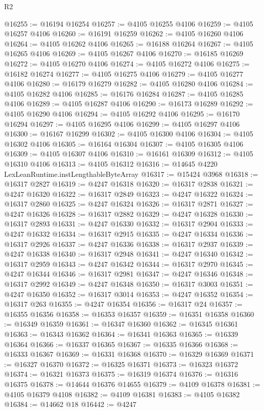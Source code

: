\begin{lexlean}{R2}
\begin{coremodule}
@16255 := @16194 @16254
@16257 := @4105 @16255 @4106
@16259 := @4105 @16257 @4106
@16260 := @16191 @16259
@16262 := @4105 @16260 @4106
@16264 := @4105 @16262 @4106
@16265 := @16188 @16264
@16267 := @4105 @16265 @4106
@16269 := @4105 @16267 @4106
@16270 := @16185 @16269
@16272 := @4105 @16270 @4106
@16274 := @4105 @16272 @4106
@16275 := @16182 @16274
@16277 := @4105 @16275 @4106
@16279 := @4105 @16277 @4106
@16280 := @16179 @16279
@16282 := @4105 @16280 @4106
@16284 := @4105 @16282 @4106
@16285 := @16176 @16284
@16287 := @4105 @16285 @4106
@16289 := @4105 @16287 @4106
@16290 := @16173 @16289
@16292 := @4105 @16290 @4106
@16294 := @4105 @16292 @4106
@16295 := @16170 @16294
@16297 := @4105 @16295 @4106
@16299 := @4105 @16297 @4106
@16300 := @16167 @16299
@16302 := @4105 @16300 @4106
@16304 := @4105 @16302 @4106
@16305 := @16164 @16304
@16307 := @4105 @16305 @4106
@16309 := @4105 @16307 @4106
@16310 := @16161 @16309
@16312 := @4105 @16310 @4106
@16313 := @4105 @16312
@16316 := @14645 @4220 LexLeanRuntime.instLengthableByteArray
@16317 := @15424 @3968
@16318 := @16317 @2827
@16319 := @4247 @16318
@16320 := @16317 @2838
@16321 := @4247 @16320
@16322 := @16317 @2849
@16323 := @4247 @16322
@16324 := @16317 @2860
@16325 := @4247 @16324
@16326 := @16317 @2871
@16327 := @4247 @16326
@16328 := @16317 @2882
@16329 := @4247 @16328
@16330 := @16317 @2893
@16331 := @4247 @16330
@16332 := @16317 @2904
@16333 := @4247 @16332
@16334 := @16317 @2915
@16335 := @4247 @16334
@16336 := @16317 @2926
@16337 := @4247 @16336
@16338 := @16317 @2937
@16339 := @4247 @16338
@16340 := @16317 @2948
@16341 := @4247 @16340
@16342 := @16317 @2959
@16343 := @4247 @16342
@16344 := @16317 @2970
@16345 := @4247 @16344
@16346 := @16317 @2981
@16347 := @4247 @16346
@16348 := @16317 @2992
@16349 := @4247 @16348
@16350 := @16317 @3003
@16351 := @4247 @16350
@16352 := @16317 @3014
@16353 := @4247 @16352
@16354 := @16317 @263
@16355 := @4247 @16354
@16356 := @16317 @24
@16357 := @16355 @16356
@16358 := @16353 @16357
@16359 := @16351 @16358
@16360 := @16349 @16359
@16361 := @16347 @16360
@16362 := @16345 @16361
@16363 := @16343 @16362
@16364 := @16341 @16363
@16365 := @16339 @16364
@16366 := @16337 @16365
@16367 := @16335 @16366
@16368 := @16333 @16367
@16369 := @16331 @16368
@16370 := @16329 @16369
@16371 := @16327 @16370
@16372 := @16325 @16371
@16373 := @16323 @16372
@16374 := @16321 @16373
@16375 := @16319 @16374
@16376 := @16316 @16375
@16378 := @14644 @16376 @14655
@16379 := @4109 @16378
@16381 := @4105 @16379 @4108
@16382 := @4109 @16381
@16383 := @4105 @16382
@16384 := @14662 @18
@16442 := @4247

\end{coremodule}
\end{lexlean}
